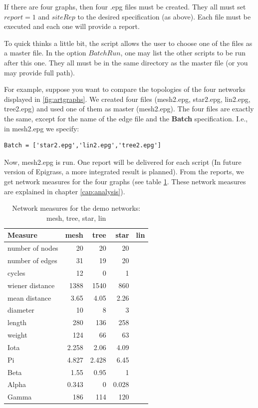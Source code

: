 If there are four graphs, then four .epg files must be created. They all must set $report=1$ and $siteRep$ to the desired specification (as above). Each file must be executed and each one will provide a report. 

To quick thinks a little bit, the script allows the user to choose one of the files as a master file. In the option $BatchRun$, one may list the other scripts to be run after this one. They all must be in the same directory as the master file (or you may provide full path).

For example, suppose you want to compare the topologies of the four networks displayed in \ref{fig:artgraphs}. We created four files (mesh2.epg, star2.epg, lin2.epg, tree2.epg) and used one of them as master (mesh2.epg). The four files are exactly the same, except for the name of the edge file and the \textbf{Batch} specification. I.e., in mesh2.epg we specify:
\begin{verbatim}
Batch = ['star2.epg','lin2.epg','tree2.epg']
\end{verbatim}
Now, mesh2.epg is run. One report will be delivered for each script (In future version of Epigrass, a more integrated result is planned). From the reports, we get network measures for the four graphs (see table \ref{netstats}. These network measures are explained in chapter \ref{cap:analysis}). 

\begin{table}
\begin{center}
 \caption{Network measures for the demo networks: mesh, tree, star, lin}
\begin{tabular}{l r r r r}
\hline
Measure & mesh & tree & star & lin \\
\hline
number of nodes & 20 & 20 & 20 &\\
number of edges & 31 & 19  & 20 &  \\
cycles & 12 & 0 & 1 &\\
wiener distance & 1388 & 1540 & 860 &\\
mean distance & 3.65 & 4.05 & 2.26 &\\
diameter & 10 & 8 & 3 &\\
length & 280 & 136 & 258 &\\
weight & 124 & 66 & 63 &\\
Iota & 2.258 & 2.06 & 4.09 &\\
Pi & 4.827 & 2.428 & 6.45 &\\
Beta & 1.55 & 0.95 & 1 &\\
Alpha & 0.343 & 0 & 0.028 &\\
Gamma & 186 & 114 & 120 &\\
\hline
\end{tabular}
\label{netstats}
\end{center}
\end{table} 


